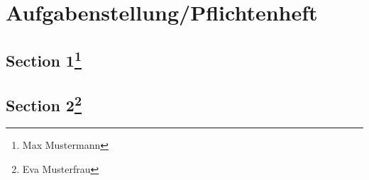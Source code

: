 

\chapter{Aufgabenstellung/Pflichtenheft}


\section{Section 1\protect\footnote{Max Mustermann}}



\section{Section 2\protect\footnote{Eva Musterfrau}}